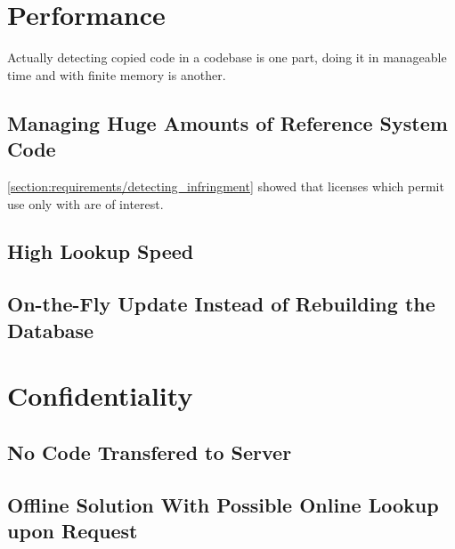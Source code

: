 \section{Performance}
Actually detecting copied code in a codebase is one part, doing it in manageable time and with finite memory is another.

\subsection{Managing Huge Amounts of Reference System Code}
\autoref{section:requirements/detecting_infringment} showed that licenses which permit use only with are of interest.
\subsection{High Lookup Speed}
\subsection{On-the-Fly Update Instead of Rebuilding the Database}

\section{Confidentiality}
\subsection{No Code Transfered to Server}
\subsection{Offline Solution With Possible Online Lookup upon Request}
